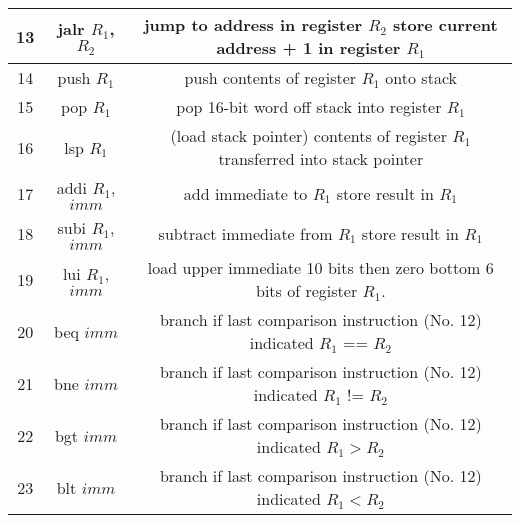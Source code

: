 \documentclass{article}
\begin{document}
\begin{par}
\begin{center}
\begin{tabular}{|c|c|c|}
			\hline
			13 & jalr $ R_{1} $, $ R_{2} $ & jump to address in register $ R_{2} $ store current address + 1 in register $ R_{1} $ \\
			\hline
			14 & push $ R_{1} $ & push contents of register $ R_{1} $ onto stack \\
			\hline
			15 & pop $ R_{1} $ & pop 16-bit word off stack into register $ R_{1} $ \\
			\hline
			16 & lsp $ R_{1} $ & (load stack pointer) contents of register $ R_{1} $ transferred into stack pointer \\
			\hline
			17 & addi $ R_{1} $, $ imm $ & add immediate to $ R_{1} $ store result in $ R_{1} $  \\
			\hline
			18 & subi $ R_{1} $, $ imm $ & subtract immediate from $ R_{1} $ store result in $ R_{1} $  \\
			\hline
			19 & lui $ R_{1} $, $ imm $ & load upper immediate 10 bits then zero bottom 6 bits of register $ R_{1} $. \\
			\hline
			20 & beq $ imm $ & branch if last comparison instruction (No. 12) indicated $ R_{1} $ == $ R_{2} $ \\
			\hline
			21 & bne $ imm $ & branch if last comparison instruction (No. 12) indicated $ R_{1} $ != $ R_{2} $ \\
			\hline
			22 & bgt $ imm $ & branch if last comparison instruction (No. 12) indicated $ R_{1} > R_{2} $ \\
			\hline
			23 & blt $ imm $ & branch if last comparison instruction (No. 12) indicated $ R_{1} < R_{2} $ \\
			\hline
		\end{tabular}
	\end{center}
\end{par}

\newpage
\end{document}
